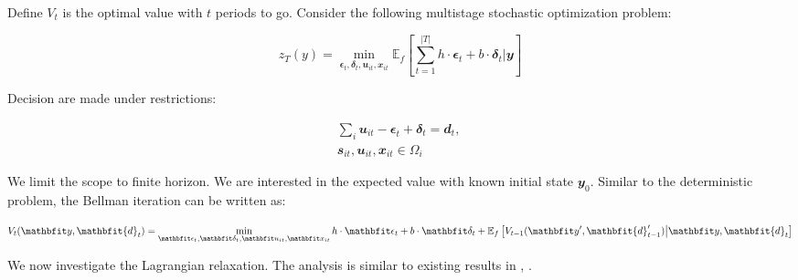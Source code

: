 \documentclass[../main]{subfiles}
\begin{document}
Define \(V_{t}\) is the optimal value with \(t\) periods to go. Consider
the following multistage stochastic optimization problem:

\begin{equation}\label{eq:dynamic_fmp.model}
  z_T(y) = \min_{\mathbfit\epsilon_t, \mathbfit\delta_t, \mathbfit u_{it}, \mathbfit x_{it}}
  \mathbb{E}_f \left[ \sum_{t=1}^{|T|}h \cdot \mathbfit \epsilon_t + b \cdot \mathbfit \delta_t  | \mathbfit y \right]
\end{equation}

Decision are made under restrictions:

\begin{align}
   & \sum_i \mathbfit u_{it} - \mathbfit\epsilon_t + \mathbfit\delta_t = \mathbfit{d}_t, \quad \\
   & \mathbfit s_{it}, \mathbfit u_{it}, \mathbfit x_{it}\in \Omega_i
\end{align}

We limit the scope to finite horizon. We are interested in the
expected value with known initial state \(\mathbfit y_0\).
Similar to the deterministic problem, the Bellman iteration can be
written as:

\begin{equation}\label{eq:dynamic_fmp.main_iteration}
  V_{t}(\mathbfit y, \mathbfit{d}_t) =
  \min_{\small{\mathbfit\epsilon_t, \mathbfit\delta_t, \mathbfit u_{it}, \mathbfit x_{it}}}
  h \cdot \mathbfit \epsilon_t + b \cdot \mathbfit \delta_t +
  \mathbb E_{f} \left [ V_{t-1}(\mathbfit y', \mathbfit{d}'_{t-1}) \big | \mathbfit y, \mathbfit{d}_t\right]
\end{equation}

We now investigate the Lagrangian relaxation. The analysis is similar to
existing results in \cite{adelman_relaxations_2008}, \cite{hawkins_langrangian_2003}.
\end{document}
